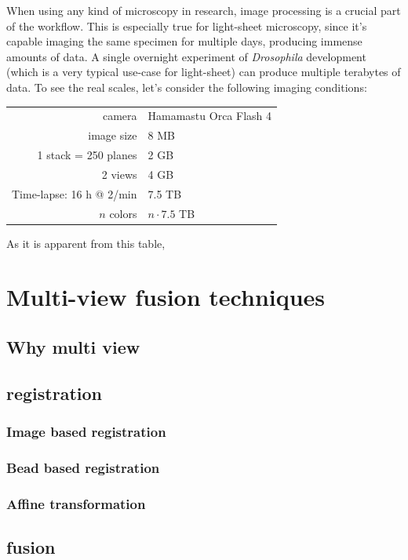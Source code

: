 \documentclass{diploma_style}
\begin{document}
When using any kind of microscopy in research, image processing is a crucial part of the workflow. This is especially true for light-sheet microscopy, since it's capable imaging the same specimen for multiple days, producing immense amounts of data. A single overnight experiment of \textit{Drosophila} development (which is a very typical use-case for light-sheet) can produce multiple terabytes of data. To see the real scales, let's consider the following imaging conditions:
\begin{center}
\begin{tabular}{rl}
	camera & Hamamastu Orca Flash 4 \\
	image size & 8 MB \\
	1 stack = 250 planes & 2 GB \\
	2 views & 4 GB \\
	Time-lapse: 16 h @ 2/min & 7.5 TB \\
	$n$ colors & $n\cdot 7.5$ TB
\end{tabular}
\end{center}

As it is apparent from this table, 


\section{Multi-view fusion techniques}
	\subsection{Why multi view}
	
	\subsection{registration}
		\subsubsection{Image based registration}
		\subsubsection{Bead based registration}
		\subsubsection{Affine transformation}
	\subsection{fusion}
\end{document}
